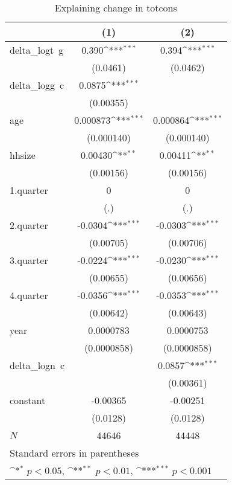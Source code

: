 \begin{table}[htbp]\centering
\def\sym#1{\ifmmode^{#1}\else\(^{#1}\)\fi}
\caption{\label{logtotcons\_deltacons} Explaining change in totcons}
\begin{tabular}{l*{2}{c}}
\hline\hline
            &\multicolumn{1}{c}{(1)}         &\multicolumn{1}{c}{(2)}         \\
\hline
delta\_logt~g&       0.390\sym{***}&       0.394\sym{***}\\
            &    (0.0461)         &    (0.0462)         \\
delta\_logg~c&      0.0875\sym{***}&                     \\
            &   (0.00355)         &                     \\
age         &    0.000873\sym{***}&    0.000864\sym{***}\\
            &  (0.000140)         &  (0.000140)         \\
hhsize      &     0.00430\sym{**} &     0.00411\sym{**} \\
            &   (0.00156)         &   (0.00156)         \\
1.quarter   &           0         &           0         \\
            &         (.)         &         (.)         \\
2.quarter   &     -0.0304\sym{***}&     -0.0303\sym{***}\\
            &   (0.00705)         &   (0.00706)         \\
3.quarter   &     -0.0224\sym{***}&     -0.0230\sym{***}\\
            &   (0.00655)         &   (0.00656)         \\
4.quarter   &     -0.0356\sym{***}&     -0.0353\sym{***}\\
            &   (0.00642)         &   (0.00643)         \\
year        &   0.0000783         &   0.0000753         \\
            & (0.0000858)         & (0.0000858)         \\
delta\_logn~c&                     &      0.0857\sym{***}\\
            &                     &   (0.00361)         \\
constant    &    -0.00365         &    -0.00251         \\
            &    (0.0128)         &    (0.0128)         \\
\hline
\(N\)       &       44646         &       44448         \\
\hline\hline
\multicolumn{3}{l}{\footnotesize Standard errors in parentheses}\\
\multicolumn{3}{l}{\footnotesize \sym{*} \(p<0.05\), \sym{**} \(p<0.01\), \sym{***} \(p<0.001\)}\\
\end{tabular}
\end{table}

